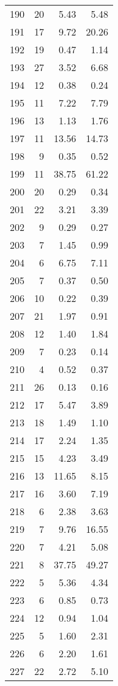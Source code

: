 \begin{longtable}{c r r r}
  190 & 20  & 5.43 & 5.48 \\ 
  191 & 17  & 9.72 & 20.26 \\ 
  192 & 19  & 0.47 & 1.14 \\ 
  193 & 27  & 3.52 & 6.68 \\ 
  194 & 12  & 0.38 & 0.24 \\ 
  195 & 11  & 7.22 & 7.79 \\ 
  196 & 13  & 1.13 & 1.76 \\ 
  197 & 11  & 13.56 & 14.73 \\ 
  198 & 9  & 0.35 & 0.52 \\ 
  199 & 11  & 38.75 & 61.22 \\ 
  200 & 20  & 0.29 & 0.34 \\ 
  201 & 22  & 3.21 & 3.39 \\ 
  202 & 9  & 0.29 & 0.27 \\ 
  203 & 7  & 1.45 & 0.99 \\ 
  204 & 6  & 6.75 & 7.11 \\ 
  205 & 7  & 0.37 & 0.50 \\ 
  206 & 10  & 0.22 & 0.39 \\ 
  207 & 21  & 1.97 & 0.91 \\ 
  208 & 12  & 1.40 & 1.84 \\ 
  209 & 7  & 0.23 & 0.14 \\ 
  210 & 4  & 0.52 & 0.37 \\ 
  211 & 26  & 0.13 & 0.16 \\ 
  212 & 17  & 5.47 & 3.89 \\ 
  213 & 18  & 1.49 & 1.10 \\ 
  214 & 17  & 2.24 & 1.35 \\ 
  215 & 15  & 4.23 & 3.49 \\ 
  216 & 13  & 11.65 & 8.15 \\ 
  217 & 16  & 3.60 & 7.19 \\ 
  218 & 6  & 2.38 & 3.63 \\ 
  219 & 7  & 9.76 & 16.55 \\ 
  220 & 7  & 4.21 & 5.08 \\ 
  221 & 8  & 37.75 & 49.27 \\ 
  222 & 5  & 5.36 & 4.34 \\ 
  223 & 6  & 0.85 & 0.73 \\ 
  224 & 12  & 0.94 & 1.04 \\ 
  225 & 5  & 1.60 & 2.31 \\ 
  226 & 6  & 2.20 & 1.61 \\ 
  227 & 22  & 2.72 & 5.10 \\ 

\end{longtable}
